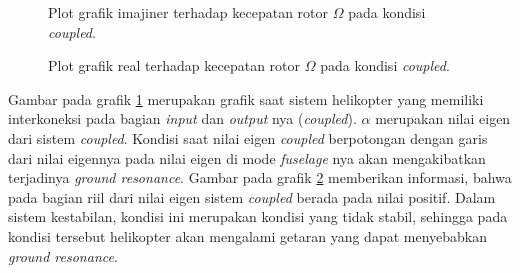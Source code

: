 \begin{figure}[H]
	\centering
	\caption{Plot grafik imajiner terhadap kecepatan rotor $\Omega$ pada kondisi \textit{coupled}.}
	\label{fig:imag(coupled)}
\end{figure}

\begin{figure}[h]
	\centering
	\caption{Plot grafik real terhadap kecepatan rotor $\Omega$ pada kondisi \textit{coupled}.}
	\label{fig:real(coupled)}
\end{figure}

Gambar pada grafik \ref{fig:imag(coupled)} merupakan grafik saat sistem helikopter yang memiliki interkoneksi pada bagian \textit{input} dan \textit{output} nya (\textit{coupled}). $\alpha$ merupakan nilai eigen dari sistem \textit{coupled}. Kondisi saat nilai eigen \textit{coupled} berpotongan dengan garis dari nilai eigennya pada nilai eigen di mode \textit{fuselage} nya akan mengakibatkan terjadinya \textit{ground resonance}. Gambar pada grafik \ref{fig:real(coupled)} memberikan informasi, bahwa pada bagian riil dari nilai eigen sistem \textit{coupled} berada pada nilai positif. Dalam sistem kestabilan, kondisi ini merupakan kondisi yang tidak stabil, sehingga pada kondisi tersebut helikopter akan mengalami getaran yang dapat menyebabkan \textit{ground resonance}. 


